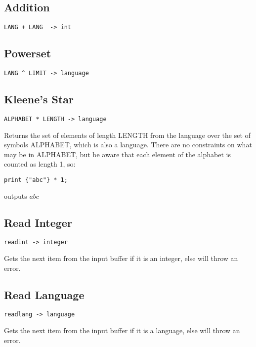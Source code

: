 \subsection{Addition}
\begin{verbatim}
LANG + LANG  -> int
\end{verbatim}
\begin{normalsize}

\end{normalsize}

\subsection{Powerset}
\begin{verbatim}
LANG ^ LIMIT -> language
\end{verbatim}
\begin{normalsize}

\end{normalsize}

\subsection{Kleene's Star}
\begin{verbatim}
ALPHABET * LENGTH -> language
\end{verbatim}
\begin{normalsize}
Returns the set of elements of length LENGTH from the language over the set of symbols ALPHABET, which is also a language. There are no constraints on what may be in ALPHABET, but be aware that each element of the alphabet is counted as length 1, so:
\begin{verbatim}
print {"abc"} * 1;
\end{verbatim}
outputs $ abc $
\end{normalsize}

\subsection{Read Integer}
\begin{verbatim}
readint -> integer
\end{verbatim}
\begin{normalsize}
Gets the next item from the input buffer if it is an integer, else will throw an error.
\end{normalsize}

\subsection{Read Language}
\begin{verbatim}
readlang -> language
\end{verbatim}
\begin{normalsize}
Gets the next item from the input buffer if it is a language, else will throw an error.
\end{normalsize}




\iffalse
\subsection{Addition}
\begin{verbatim}
LANG I LANG -> 
\end{verbatim}
\begin{normalsize}

\end{normalsize}
\fi